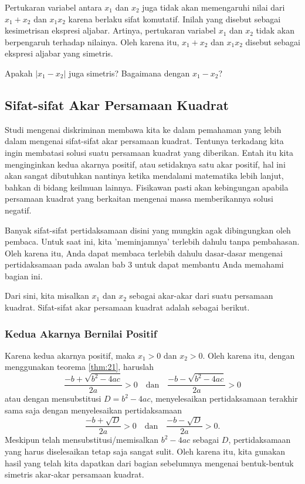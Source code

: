 	\par Pertukaran variabel antara $ x_{1} $ dan $ x_{2} $ juga tidak akan memengaruhi nilai dari $ x_{1} + x_{2} $ dan $ x_{1}x_{2} $ karena berlaku sifat komutatif. Inilah yang disebut sebagai kesimetrisan ekspresi aljabar. Artinya, pertukaran variabel $ x_{1} $ dan $ x_{2} $ tidak akan berpengaruh terhadap nilainya. Oleh karena itu, $ x_{1} + x_{2} $ dan $ x_{1}x_{2} $ disebut sebagai ekspresi aljabar yang simetris.
	
	\begin{explbox}
		Apakah $ \left|x_{1} - x_{2}\right| $ juga simetris? Bagaimana dengan $ x_{1} - x_{2} $?
	\end{explbox}

\subsection{Sifat-sifat Akar Persamaan Kuadrat}
	
	Studi mengenai diskriminan membawa kita ke dalam pemahaman yang lebih dalam mengenai sifat-sifat akar persamaan kuadrat. Tentunya terkadang kita ingin membatasi solusi suatu persamaan kuadrat yang diberikan. Entah itu kita menginginkan kedua akarnya positif, atau setidaknya satu akar positif, hal ini akan sangat dibutuhkan nantinya ketika mendalami matematika lebih lanjut, bahkan di bidang keilmuan lainnya. Fisikawan pasti akan kebingungan apabila persamaan kuadrat yang berkaitan mengenai massa memberikannya solusi negatif.
	
	\begin{catatan}
		Banyak sifat-sifat pertidaksamaan disini yang mungkin agak dibingungkan oleh pembaca. Untuk saat ini, kita 'meminjamnya' terlebih dahulu tanpa pembahasan. Oleh karena itu, Anda dapat membaca terlebih dahulu dasar-dasar mengenai pertidaksamaan pada awalan bab 3 untuk dapat membantu Anda memahami bagian ini.
	\end{catatan}
	
	\par Dari sini, kita misalkan $ x_{1} $ dan $ x_{2} $ sebagai akar-akar dari suatu persamaan kuadrat. Sifat-sifat akar persamaan kuadrat adalah sebagai berikut.
	
	\subsubsection{Kedua Akarnya Bernilai Positif}
	
		Karena kedua akarnya positif, maka $ x_{1} > 0 $ dan $ x_{2} > 0 $. Oleh karena itu, dengan menggunakan teorema \ref{thm:21}, haruslah
		\[ \frac{-b + \sqrt{b^{2} - 4ac}}{2a} > 0 \quad \mbox{dan} \quad \frac{-b - \sqrt{b^{2} - 4ac}}{2a} > 0 \]
		atau dengan mensubstitusi $ D = b^{2} - 4ac $, menyelesaikan pertidaksamaan terakhir sama saja dengan menyelesaikan pertidaksamaan
		\[ \frac{-b + \sqrt{D}}{2a} > 0 \quad \mbox{dan} \quad \frac{-b - \sqrt{D}}{2a} > 0. \]
		Meskipun telah mensubstitusi/memisalkan $ b^{2} - 4ac $ sebagai $ D $, pertidaksamaan yang harus diselesaikan tetap saja sangat sulit. Oleh karena itu, kita gunakan hasil yang telah kita dapatkan dari bagian sebelumnya mengenai bentuk-bentuk simetris akar-akar persamaan kuadrat.
		
